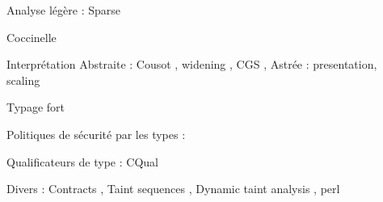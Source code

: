 Analyse légère : Sparse 

Coccinelle \cite{coccinelle09} \cite{coccinelle11} 

Interprétation Abstraite : Cousot \cite{Cousot77,Cousot92-1},
    widening \cite{granger},
    CGS \cite{cgs},
    Astrée : presentation\cite{Astree04,Astree05}, scaling \cite{AstreeScale}

Typage fort \cite{TAPL}

Politiques de sécurité par les types : \cite{lightweight-static-capabilities,LZ06a}

Qualificateurs de type : CQual \cite{pldi99,usenix01,pldi02,cquk-usenix04,toplas-quals}

Divers : Contracts \cite{cssv}, Taint sequences \cite{mdv10}, Dynamic taint analysis \cite{oakland10}, perl
